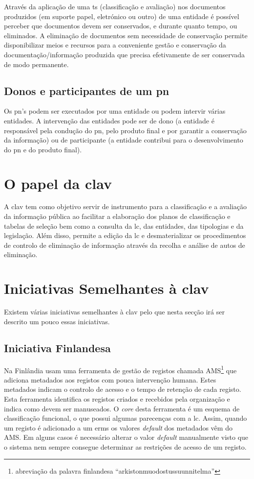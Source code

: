 Através da aplicação de uma \acrshort{ts} (classificação e avaliação) nos documentos produzidos (em suporte papel, eletrónico ou outro) de uma entidade é possível perceber que documentos devem ser conservados, e durante quanto tempo, ou eliminados. A eliminação de documentos sem necessidade de conservação permite disponibilizar meios e recursos para a conveniente gestão e conservação da documentação/informação produzida que precisa efetivamente de ser conservada de modo permanente.~\cite{ts}

\subsection{Donos e participantes de um \acrlong{pn}}

Os \acrshort{pn}'s podem ser executados por uma entidade ou podem intervir várias entidades. A intervenção das entidades pode ser de dono (a entidade é responsável pela condução do \acrshort{pn}, pelo produto final e por garantir a conservação da informação) ou de participante (a entidade contribui para o desenvolvimento do \acrshort{pn} e do produto final).

\section{O papel da \acrshort{clav}}

A \acrshort{clav} tem como objetivo servir de instrumento para a classificação e a avaliação da informação pública ao facilitar a elaboração dos planos de classificação e tabelas de seleção bem como a consulta da \acrshort{lc}, das entidades, das tipologias e da legislação. Além disso, permite a edição da \acrshort{lc} e desmaterializar os procedimentos de controlo de eliminação de informação através da recolha e análise de autos de eliminação.

\section{Iniciativas Semelhantes à \acrshort{clav}}

Existem várias iniciativas semelhantes à \acrshort{clav} pelo que nesta secção irá ser descrito um pouco essas iniciativas.

\subsection{Iniciativa Finlandesa}
Na Finlândia usam uma ferramenta de gestão de registos chamada AMS\footnote{abreviação da palavra finlandesa ``arkistonmuodostussuunnitelma''} que adiciona metadados aos registos com pouca intervenção humana. Estes metadados indicam o controlo de acesso e o tempo de retenção de cada registo. Esta ferramenta identifica os registos criados e recebidos pela organização e indica como devem ser manuseados. O \textit{core} desta ferramenta é um esquema de classificação funcional, o que possui algumas parecenças com a \acrshort{lc}. Assim, quando um registo é adicionado a um \acrfull{erms} os valores \textit{default} dos metadados vêm do AMS. Em alguns casos é necessário alterar o valor \textit{default} manualmente visto que o sistema nem sempre consegue determinar as restrições de acesso de um registo.

